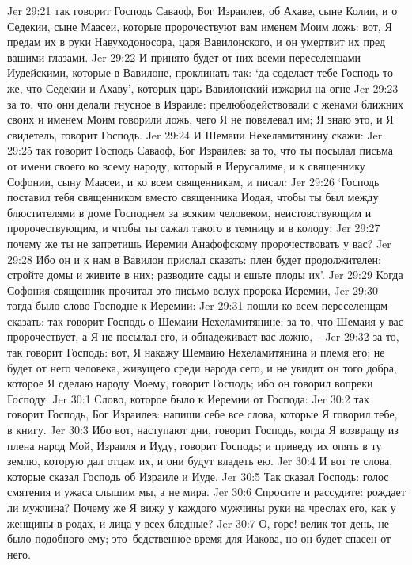 Jer 29:21  так говорит Господь Саваоф, Бог Израилев, об Ахаве, сыне Колии, и о Седекии, сыне Маасеи, которые пророчествуют вам именем Моим ложь: вот, Я предам их в руки Навуходоносора, царя Вавилонского, и он умертвит их пред вашими глазами.
Jer 29:22  И принято будет от них всеми переселенцами Иудейскими, которые в Вавилоне, проклинать так: `да соделает тебе Господь то же, что Седекии и Ахаву', которых царь Вавилонский изжарил на огне
Jer 29:23  за то, что они делали гнусное в Израиле: прелюбодействовали с женами ближних своих и именем Моим говорили ложь, чего Я не повелевал им; Я знаю это, и Я свидетель, говорит Господь.
Jer 29:24  И Шемаии Нехеламитянину скажи:
Jer 29:25  так говорит Господь Саваоф, Бог Израилев: за то, что ты посылал письма от имени своего ко всему народу, который в Иерусалиме, и к священнику Софонии, сыну Маасеи, и ко всем священникам, и писал:
Jer 29:26  `Господь поставил тебя священником вместо священника Иодая, чтобы ты был между блюстителями в доме Господнем за всяким человеком, неистовствующим и пророчествующим, и чтобы ты сажал такого в темницу и в колоду:
Jer 29:27  почему же ты не запретишь Иеремии Анафофскому пророчествовать у вас?
Jer 29:28  Ибо он и к нам в Вавилон прислал сказать: плен будет продолжителен: стройте домы и живите в них; разводите сады и ешьте плоды их'.
Jer 29:29  Когда Софония священник прочитал это письмо вслух пророка Иеремии,
Jer 29:30  тогда было слово Господне к Иеремии:
Jer 29:31  пошли ко всем переселенцам сказать: так говорит Господь о Шемаии Нехеламитянине: за то, что Шемаия у вас пророчествует, а Я не посылал его, и обнадеживает вас ложно, --
Jer 29:32  за то, так говорит Господь: вот, Я накажу Шемаию Нехеламитянина и племя его; не будет от него человека, живущего среди народа сего, и не увидит он того добра, которое Я сделаю народу Моему, говорит Господь; ибо он говорил вопреки Господу.
Jer 30:1  Слово, которое было к Иеремии от Господа:
Jer 30:2  так говорит Господь, Бог Израилев: напиши себе все слова, которые Я говорил тебе, в книгу.
Jer 30:3  Ибо вот, наступают дни, говорит Господь, когда Я возвращу из плена народ Мой, Израиля и Иуду, говорит Господь; и приведу их опять в ту землю, которую дал отцам их, и они будут владеть ею.
Jer 30:4  И вот те слова, которые сказал Господь об Израиле и Иуде.
Jer 30:5  Так сказал Господь: голос смятения и ужаса слышим мы, а не мира.
Jer 30:6  Спросите и рассудите: рождает ли мужчина? Почему же Я вижу у каждого мужчины руки на чреслах его, как у женщины в родах, и лица у всех бледные?
Jer 30:7  О, горе! велик тот день, не было подобного ему; это--бедственное время для Иакова, но он будет спасен от него.
